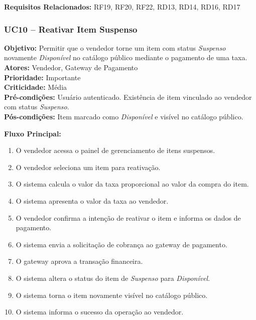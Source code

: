 \documentclass[
	article,			%
	11pt,				%
	oneside,			%
	a4paper,			%
	english,			%
	brazil,				%
	sumario=tradicional
	]{abntex2}
\begin{document}
\vspace{0.5em}
\noindent\textbf{Requisitos Relacionados:} RF19, RF20, RF22, RD13, RD14, RD16, RD17


\subsubsection{UC10 – Reativar Item Suspenso}
\label{uc:10}
\noindent\textbf{Objetivo:} Permitir que o vendedor torne um item com status \textit{Suspenso} novamente \textit{Disponível} no catálogo público mediante o pagamento de uma taxa.\\
\textbf{Atores:} Vendedor, Gateway de Pagamento\\
\textbf{Prioridade:} Importante\\
\textbf{Criticidade:} Média\\
\textbf{Pré-condições:} Usuário autenticado. Existência de item vinculado ao vendedor com status \textit{Suspenso}.\\
\textbf{Pós-condições:} Item marcado como \textit{Disponível} e visível no catálogo público.

\vspace{0.5em}
\noindent\textbf{Fluxo Principal:}
\begin{enumerate}[label=\arabic*.]
    \item O vendedor acessa o painel de gerenciamento de itens suspensos.
    \item O vendedor seleciona um item para reativação.
    \item O sistema calcula o valor da taxa proporcional ao valor da compra do item.
    \item O sistema apresenta o valor da taxa ao vendedor.
    \item O vendedor confirma a intenção de reativar o item e informa os dados de pagamento.
    \item O sistema envia a solicitação de cobrança ao gateway de pagamento.
    \item O gateway aprova a transação financeira.
    \item O sistema altera o status do item de \textit{Suspenso} para \textit{Disponível}.
    \item O sistema torna o item novamente visível no catálogo público.
    \item O sistema informa o sucesso da operação ao vendedor.
\end{enumerate}
\end{document}
